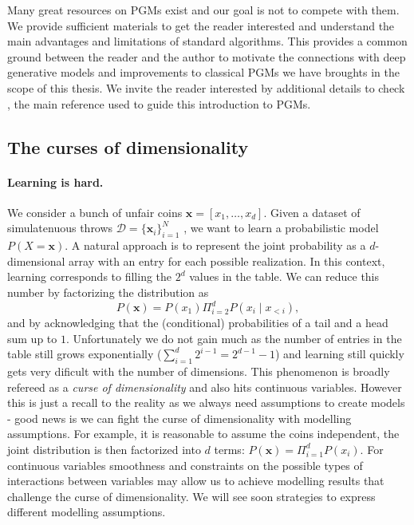 Many great resources on PGMs exist and our goal is not to compete with them. We provide sufficient materials to get the reader interested and understand the main advantages and limitations of standard algorithms. This provides a common ground between the reader and the author to motivate the connections with deep generative models and improvements to classical PGMs we have broughts in the scope of this thesis. We invite the reader interested by additional details to check \citet{koller_probabilistic_2009}, the main reference used to guide this introduction to PGMs.

\subsection{The curses of dimensionality}
\paragraph{Learning is hard.} We consider a bunch of unfair coins $\bm{x} = \left[x_1, \dots, x_d \right]$. Given a dataset of simulatenuous throws $\mathcal{D} = \{\bm{x}_i\}_{i=1}^N$ , we want to learn a probabilistic model $P(X=\bm{x})$. A natural approach is to represent the joint probability as a $d$-dimensional array with an entry for each possible realization. In this context, learning corresponds to filling the $2^d$ values in the table. We can reduce this number by factorizing the distribution as
$$P(\bm{x}) = P(x_1)\Pi_{i=2}^d P(x_i\mid x_{<i}),$$ and by acknowledging that the (conditional) probabilities of a tail and a head sum up to $1$. Unfortunately we do not gain much as the number of entries in the table still grows exponentially ($\sum_{i=1}^d 2^{i-1} = 2^{d-1} - 1$) and learning still quickly gets very dificult with the number of dimensions. This phenomenon is broadly refereed as a \textit{curse of dimensionality} and also hits continuous variables. However this is just a recall to the reality as we always need assumptions to create models - good news is we can fight the curse of dimensionality with modelling assumptions. For example, it is reasonable to assume the coins independent, the joint distribution is then factorized into $d$ terms: $ P(\bm{x}) = \Pi_{i=1}^d P(x_i)$. For continuous variables smoothness and constraints on the possible types of interactions between variables may allow us to achieve modelling results that challenge the curse of dimensionality. We will see soon strategies to express different modelling assumptions.

